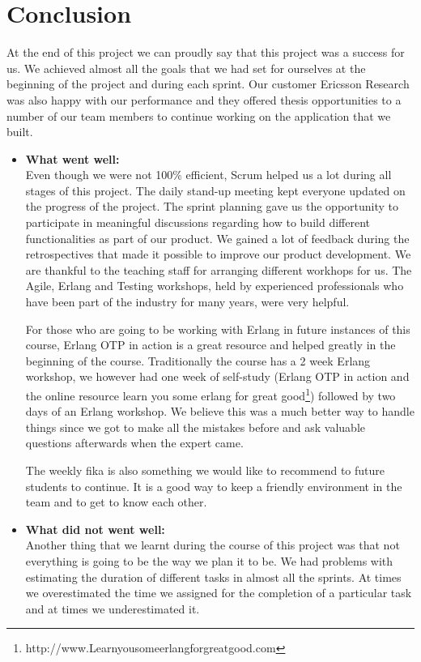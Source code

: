 \section{Conclusion}
At the end of this project we can proudly say that this project was a success for us. 
We achieved almost all the goals that we had set for ourselves at the beginning of the project 
and during each sprint. Our customer Ericsson Research was also happy with our performance and 
they offered thesis opportunities to a number of our team members to continue working on the 
application that we built. 

\begin{itemize}
\item{\textbf{What went well:}}\\
Even though we were not 100\% efficient, Scrum helped us a lot 
during all stages of this project. The daily stand-up meeting kept everyone updated on the 
progress of the project. The sprint planning gave us the opportunity 
to participate in meaningful discussions regarding how to build different functionalities as part 
of our product. We gained a lot of feedback during the retrospectives that made it possible
to improve our product development. We are thankful to the teaching staff for arranging different workhops for us. 
The Agile, Erlang and Testing workshops, held by experienced professionals who have been part of the 
industry for many years, were very helpful. 

For those who are going to be working with Erlang in future instances of this course, Erlang 
OTP in action is a great resource and helped greatly in the beginning of the course. Traditionally 
the course has a 2 week Erlang workshop, we however had one week of self-study (Erlang OTP in action and 
the online resource learn you some erlang for great good\footnote{http://www.Learnyousomeerlangforgreatgood.com}) 
followed by two days of an Erlang workshop. We believe this was a much better way to handle things since we got to 
make all the mistakes before and ask valuable questions afterwards when the expert came. 

The weekly fika is also something we would like to recommend to future students to continue. It is a 
good way to keep a friendly environment in the team and to get to know each other.     

\item{\textbf{What did not went well:}}\\ 
Another thing that we learnt during the course of this project was that not everything is going to be 
the way we plan it to be. We had problems with estimating the duration of different tasks in almost all 
the sprints. At times we overestimated the time we assigned for the completion of a particular task and 
at times we underestimated it. 


\end{itemize}
